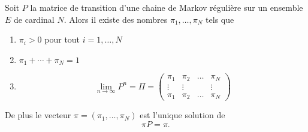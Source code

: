 \begin{theorem}
	Soit \( P\) la matrice de transition d'une chaine de Markov régulière sur un ensemble \( E\) de cardinal \( N\). Alors il existe des nombres \( \pi_1,\ldots, \pi_N\) tels que
	\begin{enumerate}
		\item
		      \( \pi_i>0\) pour tout \( i=1,\ldots, N\)
		\item
		      \( \pi_1+\cdots +\pi_N=1\)
		\item
		      \begin{equation}
			      \lim_{n\to \infty} P^n=\Pi=\begin{pmatrix}
				      \pi_1  & \pi_2  & \ldots & \pi_N  \\
				      \vdots & \vdots &        & \vdots \\
				      \pi_1  & \pi_2  & \ldots & \pi_N
			      \end{pmatrix}
		      \end{equation}
	\end{enumerate}
	De plus le vecteur \( \pi=(\pi_1,\ldots, \pi_N)\) est l'unique solution de
	\begin{equation}
		\pi P=\pi.
	\end{equation}
\end{theorem}

